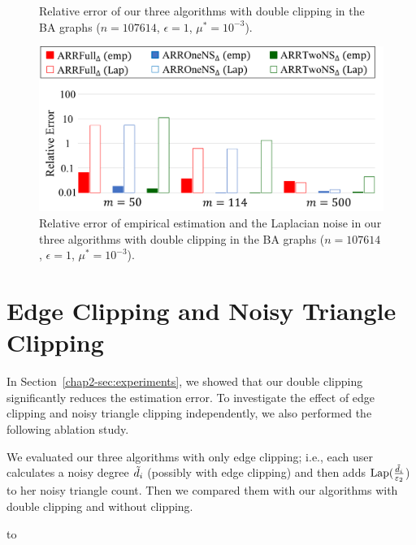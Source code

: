 {\begin{figure}[t]
  \caption[Relative error of our three algorthms with double clipping in the Barab\'{a}si-Albert graphs.]
	{Relative error of our three algorithms with double clipping in the BA graphs ($n=107614$, $\epsilon=1$, $\mu^* = 10^{-3}$).}
  \label{chap2-fig:resA_BAGraph}
\vspace{5mm}
  \centering
  \includegraphics[width=0.95\linewidth]{fig/resA_BAGraph_emp_Lap.pdf}
  
  \caption[Relative error of empirical estimation and the Laplacian noise in our three algorithms with double clipping in the Barab\'{a}si-Albert graphs.]
	{Relative error of empirical estimation and the Laplacian noise in our three algorithms with double clipping in the BA graphs ($n=107614$, $\epsilon=1$, $\mu^* = 10^{-3}$).}
  \label{chap2-fig:resA_BAGraph_emp_Lap}
\end{figure}

\section{Edge Clipping and Noisy Triangle Clipping}
\label{chap2-sec:EC_DC}
In Section~\ref{chap2-sec:experiments}, we showed that our double clipping significantly reduces the estimation error.
To investigate the effect of
edge clipping and noisy triangle clipping independently, we also performed the following ablation study.

We evaluated our three algorithms with only
edge clipping; i.e., each user calculates a noisy degree $\tilde{d}_i$ (possibly with edge clipping) and then adds $\textrm{Lap}(\frac{\tilde{d}_i}{\varepsilon_2}$) to her noisy triangle count.
Then we compared them with our algorithms with double clipping and without clipping.

\begin{table}[t]
\caption[\#$4$-cycles $C_4$ in each graph dataset.]{\#$4$-cycles $C_4$ in each graph dataset.}
\centering
\hbox to
\label{chap2-tab:resA_4cycles}
\end{table}

}
